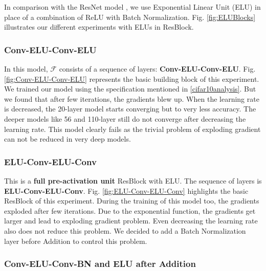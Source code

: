 \documentclass[10pt,twocolumn,letterpaper]{article}
\begin{document}
In comparison with the ResNet model \cite{[1]}, we use Exponential Linear Unit (ELU) in place of a combination of ReLU with Batch Normalization. 
Fig. \ref{fig:ELUBlocks} illustrates our different experiments with ELUs in ResBlock. 

\subsubsection{Conv-ELU-Conv-ELU}

In this model, $\mathcal{F}$ consists of a sequence of layers: \textbf{Conv-ELU-Conv-ELU}. Fig. \ref{fig:Conv-ELU-Conv-ELU} represents the basic building block of this experiment. We trained our model using the specification mentioned in \ref{cifar10analysis}. But we found that after few iterations, the gradients blew up. When the learning rate is decreased, the 20-layer model starts converging but to very less accuracy. The deeper models like 56 and 110-layer still do not converge after decreasing the learning rate. This model clearly fails as the trivial problem of exploding gradient can not be reduced in very deep models.

\subsubsection{ELU-Conv-ELU-Conv}

This is a \textbf{full pre-activation unit} ResBlock \cite{[32]} with ELU. The sequence of layers is \textbf{ELU-Conv-ELU-Conv}. Fig. \ref{fig:ELU-Conv-ELU-Conv} highlights the basic ResBlock of this experiment. During the training of this model too, the gradients exploded after few iterations. Due to the exponential function, the gradients get larger and lead to exploding gradient problem. Even decreasing the learning rate also does not reduce this problem. We decided to add a Batch Normalization layer before Addition to control this problem.

\subsubsection{Conv-ELU-Conv-BN and ELU after Addition}
\end{document}
